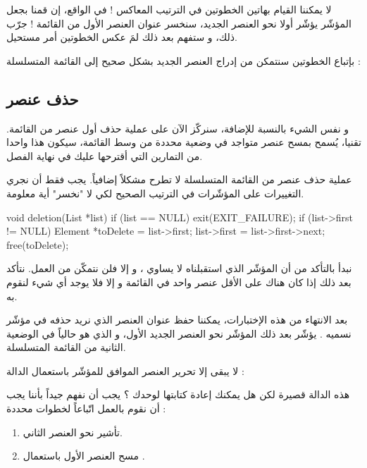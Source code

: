 \begin{warning}
لا يمكننا القيام بهاتين الخطوتين في الترتيب المعاكس ! في الواقع، إن قمنا بجعل المؤشّر
يؤشّر أولا نحو العنصر الجديد، سنخسر عنوان العنصر الأول من القائمة ! جرّب ذلك، و ستفهم بعد ذلك لمَ عكس الخطوتين أمر مستحيل.
\end{warning}

بإتباع الخطوتين سنتمكن من إدراج العنصر الجديد بشكل صحيح إلى القائمة المتسلسلة :


\subsection{حذف عنصر}

و نفس الشيء بالنسبة للإضافة، سنركّز الآن على عملية حذف أول عنصر من القائمة. تقنيا، يُسمح بمسح عنصر متواجد في وضعية محددة من وسط القائمة، سيكون هذا واحدا من التمارين التي أقترحها عليك في نهاية الفصل.

عملية حذف عنصر من القائمة المتسلسلة لا تطرح مشكلاً إضافياً. يجب فقط أن نجري التغييرات على المؤشّرات في الترتيب الصحيح لكي لا "نخسر" أية معلومة.

\begin{Csource}
void deletion(List *list)
{
	if (list == NULL)
	{
		exit(EXIT_FAILURE);
	}
	if (list->first != NULL)
	{
		Element *toDelete = list->first;
		list->first = list->first->next;
		free(toDelete);
	}
}
\end{Csource}

نبدأ بالتأكد من أن المؤشّر الذي استقبلناه لا يساوي
،
و إلا فلن نتمكّن من العمل. نتأكد بعد ذلك إذا كان هناك على الأقل عنصر واحد في القائمة و إلا فلا يوجد أي شيء لنقوم به.

بعد الانتهاء من هذه الإختبارات، يمكننا حفظ عنوان العنصر الذي نريد حذفه في مؤشّر نسميه
.
يؤشّر بعد ذلك المؤشّر
نحو العنصر الجديد الأول، و الذي هو حالياً في الوضعية الثانية من القائمة المتسلسلة.

لا يبقى إلا تحرير العنصر الموافق للمؤشّر 
باستعمال الدالة
 :


هذه الدالة قصيرة لكن هل يمكنك إعادة كتابتها لوحدك ؟ يجب أن نفهم جيداً بأننا يجب أن نقوم بالعمل اتّباعاً لخطوات محددة :

\begin{enumerate}
	\item تأشير
	نحو العنصر الثاني.
	\item مسح العنصر الأول باستعمال 
	.
\end{enumerate}

